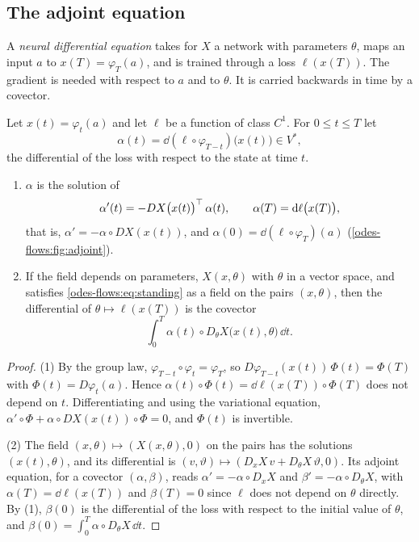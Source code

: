 \begin{notechapter}
\section{The adjoint equation}\label{odes-flows:sec:ml}

A \emph{neural differential equation} takes for $X$ a network with
parameters $\theta$, maps an input $a$ to $x(T) = \varphi_T(a)$, and
is trained through a loss $\ell(x(T))$. The gradient is needed with
respect to $a$ and to $\theta$. It is carried backwards in time by a
covector.

\begin{proposition}\label{odes-flows:prop:adjoint}
Let $x(t) = \varphi_t(a)$ and let $\ell$ be a function of class $C^1$.
For $0\leq t\leq T$ let
\[
  \alpha(t) = \dd(\ell\circ\varphi_{T-t})\bigl(x(t)\bigr)\in V^* ,
\]
the differential of the loss with respect to the state at time $t$.
\begin{enumerate}[nosep]
  \item $\alpha$ is the solution of
        \[
          \alpha'(t) = -DX\bigl(x(t)\bigr)^{\top}\,\alpha(t) ,
          \qquad \alpha(T) = \mathrm{d}\ell\bigl(x(T)\bigr) ,
        \]
        that is, $\alpha' = -\alpha\circ DX(x(t))$, and
        $\alpha(0) = \dd(\ell\circ\varphi_T)(a)$
        (\cref{odes-flows:fig:adjoint}).
  \item If the field depends on parameters, $X(x, \theta)$ with
        $\theta$ in a vector space, and satisfies
        \eqref{odes-flows:eq:standing} as a field on the pairs
        $(x, \theta)$, then the differential of
        $\theta\mapsto\ell(x(T))$ is the covector
        \[
          \int_0^T\alpha(t)\circ D_\theta X\bigl(x(t), \theta\bigr)\,
          \dd t .
        \]
\end{enumerate}
\end{proposition}

\begin{proof}
(1) By the group law,
$\varphi_{T-t}\circ\varphi_t = \varphi_T$, so
$D\varphi_{T-t}(x(t))\,\Phi(t) = \Phi(T)$ with
$\Phi(t) = D\varphi_t(a)$. Hence
$\alpha(t)\circ\Phi(t) = \dd\ell(x(T))\circ\Phi(T)$ does not depend
on $t$. Differentiating and using the variational equation,
$\alpha'\circ\Phi + \alpha\circ DX(x(t))\circ\Phi = 0$, and $\Phi(t)$
is invertible.

(2) The field $(x, \theta)\mapsto(X(x, \theta), 0)$ on the pairs has
the solutions $(x(t), \theta)$, and its differential is
$(v, \vartheta)\mapsto(D_xX\,v + D_\theta X\,\vartheta, 0)$. Its
adjoint equation, for a covector $(\alpha, \beta)$, reads
$\alpha' = -\alpha\circ D_xX$ and $\beta' = -\alpha\circ D_\theta X$,
with $\alpha(T) = \dd\ell(x(T))$ and $\beta(T) = 0$ since $\ell$ does
not depend on $\theta$ directly. By (1), $\beta(0)$ is the
differential of the loss with respect to the initial value of
$\theta$, and $\beta(0) = \int_0^T\alpha\circ D_\theta X\,\dd t$.
\end{proof}


\end{notechapter}
